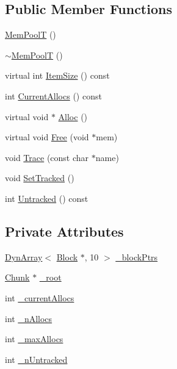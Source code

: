 \subsection*{Public Member Functions}
\begin{DoxyCompactItemize}
\item 
\hyperlink{classtinyxml2_1_1_mem_pool_t_a8a69a269ea72e292dde65309528ef64b}{Mem\-Pool\-T} ()
\item 
\hyperlink{classtinyxml2_1_1_mem_pool_t_ad6bb8346ad5b9a34f8f0051da5e3ed3f}{$\sim$\-Mem\-Pool\-T} ()
\item 
virtual int \hyperlink{classtinyxml2_1_1_mem_pool_t_a7ec8778fe99f6e332615a703be0b48bc}{Item\-Size} () const 
\item 
int \hyperlink{classtinyxml2_1_1_mem_pool_t_a56be11b7db6a7ef00db17088a7769aab}{Current\-Allocs} () const 
\item 
virtual void $\ast$ \hyperlink{classtinyxml2_1_1_mem_pool_t_aa9d785a48ffe6ea1be679bab13464486}{Alloc} ()
\item 
virtual void \hyperlink{classtinyxml2_1_1_mem_pool_t_a4f1a0c434e9e3d7391e5c16ed4ee8c70}{Free} (void $\ast$mem)
\item 
void \hyperlink{classtinyxml2_1_1_mem_pool_t_a0bc596f271e0f139822c534238b3f244}{Trace} (const char $\ast$name)
\item 
void \hyperlink{classtinyxml2_1_1_mem_pool_t_a7798932414916199a1bc0f9c3f368521}{Set\-Tracked} ()
\item 
int \hyperlink{classtinyxml2_1_1_mem_pool_t_a524b90d0edeac41964c06510757dce0f}{Untracked} () const 
\end{DoxyCompactItemize}
\subsection*{Private Attributes}
\begin{DoxyCompactItemize}
\item 
\hyperlink{classtinyxml2_1_1_dyn_array}{Dyn\-Array}$<$ \hyperlink{structtinyxml2_1_1_mem_pool_t_1_1_block}{Block} $\ast$, 10 $>$ \hyperlink{classtinyxml2_1_1_mem_pool_t_af8eeecccb8c484c34ba04e3757e081be}{\-\_\-block\-Ptrs}
\item 
\hyperlink{uniontinyxml2_1_1_mem_pool_t_1_1_chunk}{Chunk} $\ast$ \hyperlink{classtinyxml2_1_1_mem_pool_t_af203dc16256d7631fcbedd87864390bb}{\-\_\-root}
\item 
int \hyperlink{classtinyxml2_1_1_mem_pool_t_ae80f238a4c1fb0b2c037fd62b7bdd0c2}{\-\_\-current\-Allocs}
\item 
int \hyperlink{classtinyxml2_1_1_mem_pool_t_a1afde0bfad90d20643da123781664d7a}{\-\_\-n\-Allocs}
\item 
int \hyperlink{classtinyxml2_1_1_mem_pool_t_ac757df646660b4e8eefaca0d385f97dd}{\-\_\-max\-Allocs}
\item 
int \hyperlink{classtinyxml2_1_1_mem_pool_t_aca9adac3f7ce44a132dc00c285566b1e}{\-\_\-n\-Untracked}
\end{DoxyCompactItemize}


